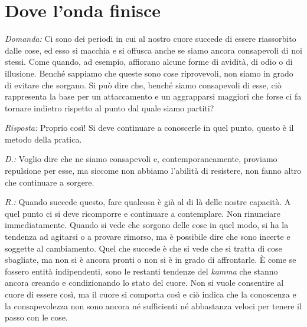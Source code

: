 \chapter{Dove l'onda finisce}

\emph{Domanda:} Ci sono dei periodi in cui al nostro cuore succede di essere
riassorbito dalle cose, ed esso si macchia e si offusca anche se siamo
ancora consapevoli di noi stessi. Come quando, ad esempio, affiorano
alcune forme di avidità, di odio o di illusione. Benché sappiamo che
queste sono cose riprovevoli, non siamo in grado di evitare che sorgano.
Si può dire che, benché siamo consapevoli di esse, ciò rappresenta la
base per un attaccamento e un aggrapparsi maggiori che forse ci fa
tornare indietro rispetto al punto dal quale siamo partiti?

\emph{Risposta:} Proprio così! Si deve continuare a conoscerle in quel punto,
questo è il metodo della pratica.

\emph{D.:} Voglio dire che ne siamo consapevoli e, contemporaneamente, proviamo
repulsione per esse, ma siccome non abbiamo l'abilità di resistere, non
fanno altro che continuare a sorgere.

\emph{R.:} Quando succede questo, fare qualcosa è già al di là delle nostre
capacità. A quel punto ci si deve ricomporre e continuare a contemplare.
Non rinunciare immediatamente. Quando si vede che sorgono delle cose in
quel modo, si ha la tendenza ad agitarsi o a provare rimorso, ma è
possibile dire che sono incerte e soggette al cambiamento. Quel che
succede è che si vede che si tratta di cose sbagliate, ma non si è
ancora pronti o non si è in grado di affrontarle. È come se fossero
entità indipendenti, sono le restanti tendenze del \emph{kamma} che
stanno ancora creando e condizionando lo stato del cuore. Non si vuole
consentire al cuore di essere così, ma il cuore si comporta così e ciò
indica che la conoscenza e la consapevolezza non sono ancora né
sufficienti né abbastanza veloci per tenere il passo con le cose.

